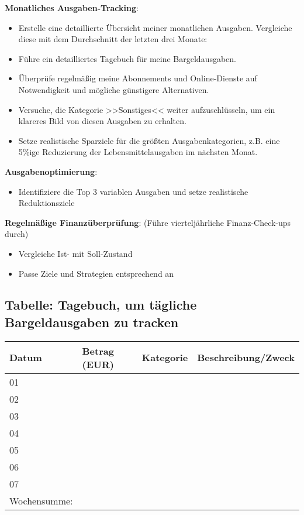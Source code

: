 \documentclass{vorlage-design-main}
\begin{document}
\textbf{Monatliches Ausgaben-Tracking}:

\begin{itemize}

\item
  Erstelle eine detaillierte Übersicht meiner monatlichen Ausgaben.
  Vergleiche diese mit dem Durchschnitt der letzten drei Monate:\\
\item
  Führe ein detailliertes Tagebuch für meine Bargeldausgaben.
\item
  Überprüfe regelmäßig meine Abonnements und Online-Dienste auf
  Notwendigkeit und mögliche günstigere Alternativen.
\item
  Versuche, die Kategorie >>Sonstiges<< weiter aufzuschlüsseln, um ein
  klareres Bild von diesen Ausgaben zu erhalten.
\item
  Setze realistische Sparziele für die größten Ausgabenkategorien, z.B.
  eine 5\%ige Reduzierung der Lebensmittelausgaben im nächsten Monat.
\end{itemize}

\textbf{Ausgabenoptimierung}:

\begin{itemize}

\item
  Identifiziere die Top 3 variablen Ausgaben und setze realistische
  Reduktionsziele
\end{itemize}

\textbf{Regelmäßige Finanzüberprüfung}: (Führe vierteljährliche
Finanz-Check-ups durch)

\begin{itemize}

\item
  Vergleiche Ist- mit Soll-Zustand
\item
  Passe Ziele und Strategien entsprechend an
\end{itemize}

\subsection{Tabelle: Tagebuch, um tägliche Bargeldausgaben zu
tracken}\label{tabelle-tagebuch-um-taegliche-bargeldausgaben-zu-tracken}

\begin{table}[ht]
  \begin{tabular}{@{}llll@{}}
  \toprule

Datum & Betrag (EUR) & Kategorie & Beschreibung/Zweck \\
\midrule[\heavyrulewidth]
01 & & & \\
02 & & & \\
03 & & & \\
04 & & & \\
05 & & & \\
06 & & & \\
07 & & & \\
Wochensumme: & & & \\
  \bottomrule
  \end{tabular}%
\end{table}


\clearpage
\printbibliography
\end{document}
